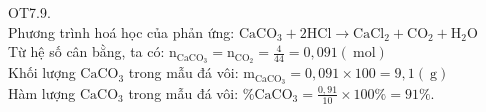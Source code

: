 \documentclass[10pt]{article}
\begin{document}
OT7.9.\\
Phương trình hoá học của phản ứng: $\mathrm{CaCO}_{3}+2 \mathrm{HCl} \rightarrow \mathrm{CaCl}_{2}+\mathrm{CO}_{2}+\mathrm{H}_{2} \mathrm{O}$\\
Từ hệ số cân bằng, ta có: $\mathrm{n}_{\mathrm{CaCO}_{3}}=\mathrm{n}_{\mathrm{CO}_{2}}=\frac{4}{44}=0,091(\mathrm{~mol})$\\
Khối lượng $\mathrm{CaCO}_{3}$ trong mẫu đá vôi: $\mathrm{m}_{\mathrm{CaCO}_{3}}=0,091 \times 100=9,1(\mathrm{~g})$\\
Hàm lượng $\mathrm{CaCO}_{3}$ trong mẫu đá vôi: $\% \mathrm{CaCO}_{3}=\frac{0,91}{10} \times 100 \%=91 \%$.
\end{document}
